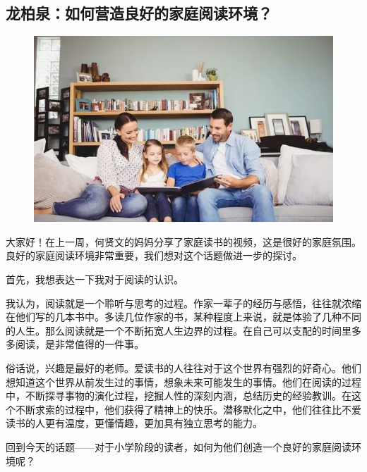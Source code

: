 \vspace{10pt}

{\centering\subsection*{龙柏泉：如何营造良好的家庭阅读环境？}}


\renewcommand{\leftmark}{龙柏泉：如何营造良好的家庭阅读环境？}

\begin{figure}[htbp]

\centering

\includegraphics[width = .5\textwidth]{./ch/v3.jpg}

\end{figure}

大家好！在上一周，何贤文的妈妈分享了家庭读书的视频，这是很好的家庭氛围。良好的家庭阅读环境非常重要，我们想对这个话题做进一步的探讨。

 

首先，我想表达一下我对于阅读的认识。

 

我认为，阅读就是一个聆听与思考的过程。作家一辈子的经历与感悟，往往就浓缩在他们写的几本书中。多读几位作家的书，某种程度上来说，就是体验了几种不同的人生。那么阅读就是一个不断拓宽人生边界的过程。在自己可以支配的时间里多多阅读，是非常值得的一件事。

 

俗话说，兴趣是最好的老师。爱读书的人往往对于这个世界有强烈的好奇心。他们想知道这个世界从前发生过的事情，想象未来可能发生的事情。他们在阅读的过程中，不断探寻事物的演化过程，挖掘人性的深刻内涵，总结历史的经验教训。在这个不断求索的过程中，他们获得了精神上的快乐。潜移默化之中，他们往往比不爱读书的人更有温度，更懂情趣，更加具有独立思考的能力。

 

回到今天的话题——对于小学阶段的读者，如何为他们创造一个良好的家庭阅读环境呢？

 

